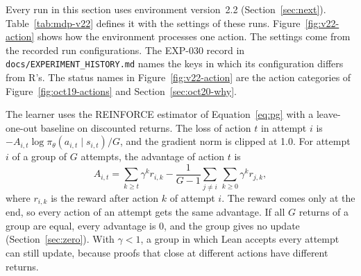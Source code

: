\documentclass[11pt]{article}
\newcommand{\pth}[1]{\nolinkurl{#1}}
\begin{document}
Every run in this section uses environment version~2.2 (Section~\ref{sec:next}).
Table~\ref{tab:mdp-v22} defines it with the settings of these runs.
Figure~\ref{fig:v22-action} shows how the environment processes one action.
The settings come from the recorded run configurations. The EXP-030 record in \pth{docs/EXPERIMENT_HISTORY.md} names the keys in which its configuration differs from R's.
The status names in Figure~\ref{fig:v22-action} are the action categories of Figure~\ref{fig:oct19-actions} and Section~\ref{sec:oct20-why}.

The learner uses the REINFORCE estimator of Equation~\eqref{eq:pg} with a leave-one-out baseline on discounted returns.
The loss of action $t$ in attempt $i$ is $-A_{i,t} \log \pi_\theta(a_{i,t} \mid s_{i,t}) / G$, and the gradient norm is clipped at 1.0.
For attempt $i$ of a group of $G$ attempts, the advantage of action $t$ is
\begin{equation}
A_{i,t} = \sum_{k \ge t} \gamma^{k} r_{i,k} - \frac{1}{G-1}\sum_{j \ne i}\,\sum_{k \ge 0} \gamma^{k} r_{j,k},
\label{eq:v22-adv}
\end{equation}
where $r_{i,k}$ is the reward after action $k$ of attempt $i$.
The reward comes only at the end, so every action of an attempt gets the same advantage.
If all $G$ returns of a group are equal, every advantage is 0, and the group gives no update (Section~\ref{sec:zero}).
With $\gamma < 1$, a group in which Lean accepts every attempt can still update, because proofs that close at different actions have different returns.
\end{document}
